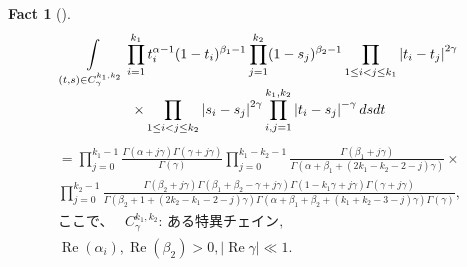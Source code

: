 \documentclass[12pt]{article} %
\newtheorem*{fact*}{Fact}
\theoremstyle{remark}
\newcommand{\mypgf}{{\mbox{{ガンマ関数の積}}}}
\newcommand{\tmop}[1]{\ensuremath{\operatorname{#1}}}
\begin{document}
			\begin{fact*}[{\cite[(3.4)]{tarasov2003selberg}}]
			{
		\begin{equation*}
			\begin{array}{c}
				\displaystyle\int_{(t,s)\in C_\gamma^{k_1,k_2}}
				\displaystyle\prod\displaylimits_{i=1}^{k_1}t_i^{\alpha-1}(1-t_i)^{\beta_1-1}
				\displaystyle\prod\displaylimits_{j=1}^{k_2}(1-s_j)^{\beta_2-1}
				\displaystyle\prod_{1\le i<j\le k_1}\myabs{t_i-t_j}^{2\gamma}\\
				\times\displaystyle\prod_{1\le i<j\le k_2}\myabs{s_i-s_j}^{2\gamma}
				\displaystyle\prod_{i,j=1}^{k_1,k_2}\myabs{t_i-s_j}^{-\gamma}dsdt
				      \end{array}\end{equation*}
			      \begin{equation*}
			\begin{array}{c}
  =\displaystyle\prod_{j = 0}^{k_1 - 1} \frac{\Gamma (\alpha + j \gamma) \Gamma (\gamma + j
  \gamma)}{\Gamma (\gamma)} \displaystyle\prod_{j = 0}^{k_1 - k_2 - 1} \frac{\Gamma
  (\beta_1 + j \gamma)}{\Gamma (\alpha + \beta_1 + (2 k_1 - k_2 - 2 - j)
  \gamma)} \times\\
  \displaystyle\prod_{j = 0}^{k_2 - 1} \frac{\Gamma (\beta_2 + j \gamma) \Gamma (\beta_1 +
  \beta_2 - \gamma + j \gamma) \Gamma (1 - k_1 \gamma + j \gamma) \Gamma
  (\gamma + j \gamma)}{\Gamma (\beta_2 + 1 + (2 k_2 - k_1 - 2 - j) \gamma)
  \Gamma (\alpha + \beta_1 + \beta_2 + (k_1 + k_2 - 3 - j) \gamma) \Gamma
  (\gamma)},\\
					  \mbox{ここで、　 }	C^{k_1,k_2}_{\gamma}\mbox{: ある特異チェイン},\\
					  \tmop{Re} (\alpha_i), \tmop{Re} (\beta_2) > 0, | \tmop{Re} \gamma | \ll 1.
			\end{array}
			\end{equation*}
				}
		\end{fact*}
\end{document}
